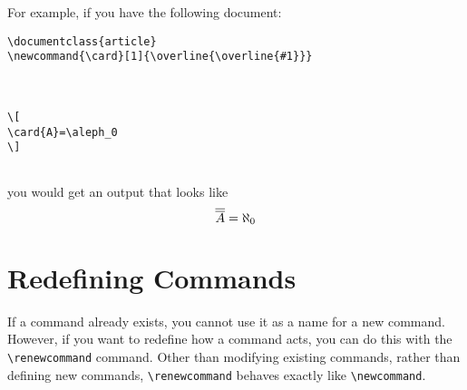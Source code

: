 For example, if you have the following document:
\begin{verbatim}
\documentclass{article}
\newcommand{\card}[1]{\overline{\overline{#1}}}



\[
\card{A}=\aleph_0
\]


\end{verbatim}
you would get an output that looks like
\[
\card{A}=\aleph_0
\]

\section{Redefining Commands}
\label{sec:redefining-commands}

If a command already exists, you cannot use it as a name for a new
command.  However, if you want to redefine how a command acts, you can
do this with the \verb|\renewcommand| command.  Other than modifying
existing commands, rather than defining new commands,
\verb|\renewcommand| behaves exactly like \verb|\newcommand|.

